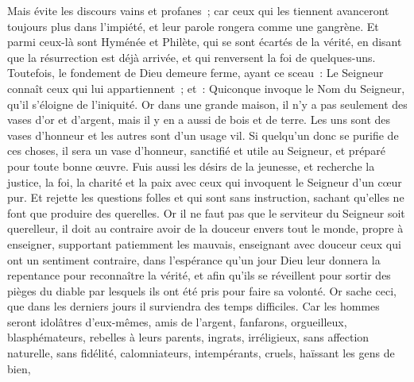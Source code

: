 \begin{multicols}{2}
Mais évite les discours vains et profanes~; car ceux qui les tiennent avanceront toujours plus dans l'impiété,
et leur parole rongera comme une gangrène. Et parmi ceux-là sont Hyménée et Philète,
qui se sont écartés de la vérité, en disant que la résurrection est déjà arrivée, et qui renversent la foi de quelques-uns.
Toutefois, le fondement de Dieu demeure ferme, ayant ce sceau~: Le Seigneur connaît ceux qui lui appartiennent~; et~: Quiconque invoque le Nom du Seigneur, qu'il s'éloigne de l'iniquité.
Or dans une grande maison, il n'y a pas seulement des vases d'or et d'argent, mais il y en a aussi de bois et de terre. Les uns sont des vases d'honneur et les autres sont d'un usage vil.
Si quelqu'un donc se purifie de ces choses, il sera un vase d'honneur, sanctifié et utile au Seigneur, et préparé pour toute bonne œuvre.
Fuis aussi les désirs de la jeunesse, et recherche la justice, la foi, la charité et la paix avec ceux qui invoquent le Seigneur d'un cœur pur.
Et rejette les questions folles et qui sont sans instruction, sachant qu'elles ne font que produire des querelles.
Or il ne faut pas que le serviteur du Seigneur soit querelleur, il doit au contraire avoir de la douceur envers tout le monde, propre à enseigner, supportant patiemment les mauvais,
enseignant avec douceur ceux qui ont un sentiment contraire, dans l'espérance qu'un jour Dieu leur donnera la repentance pour reconnaître la vérité,
et afin qu'ils se réveillent pour sortir des pièges du diable par lesquels ils ont été pris pour faire sa volonté.
\VerseOne{}Or sache ceci, que dans les derniers jours il surviendra des temps difficiles.
Car les hommes seront idolâtres d'eux-mêmes, amis de l'argent, fanfarons, orgueilleux, blasphémateurs, rebelles à leurs parents, ingrats, irréligieux,
sans affection naturelle, sans fidélité, calomniateurs, intempérants, cruels, haïssant les gens de bien,

\end{multicols}
